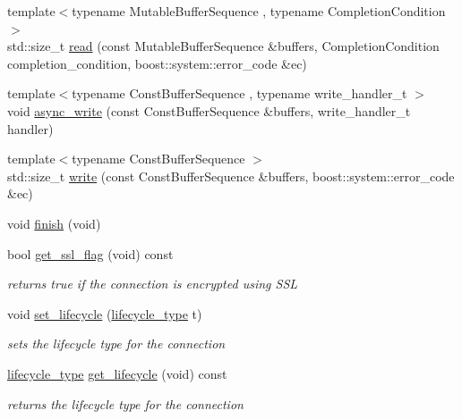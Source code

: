 \begin{DoxyCompactItemize}
\item 
{\footnotesize template$<$typename Mutable\-Buffer\-Sequence , typename Completion\-Condition $>$ }\\std\-::size\-\_\-t \hyperlink{classpion_1_1tcp_1_1connection_a7d1cc479b25984a53e0f218e3e48830f}{read} (const Mutable\-Buffer\-Sequence \&buffers, Completion\-Condition completion\-\_\-condition, boost\-::system\-::error\-\_\-code \&ec)
\item 
{\footnotesize template$<$typename Const\-Buffer\-Sequence , typename write\-\_\-handler\-\_\-t $>$ }\\void \hyperlink{classpion_1_1tcp_1_1connection_add2f2ab41a74476529b0e3ab3ca43ee1}{async\-\_\-write} (const Const\-Buffer\-Sequence \&buffers, write\-\_\-handler\-\_\-t handler)
\item 
{\footnotesize template$<$typename Const\-Buffer\-Sequence $>$ }\\std\-::size\-\_\-t \hyperlink{classpion_1_1tcp_1_1connection_a80f286832ed69151923837713e582709}{write} (const Const\-Buffer\-Sequence \&buffers, boost\-::system\-::error\-\_\-code \&ec)
\item 
void \hyperlink{classpion_1_1tcp_1_1connection_aa7ff7a6d8325c9cbfb026c1a441523fe}{finish} (void)
\item 
bool \hyperlink{classpion_1_1tcp_1_1connection_acf7f446c7113617abcff448fbd4ba441}{get\-\_\-ssl\-\_\-flag} (void) const 
\begin{DoxyCompactList}\small\item\em returns true if the connection is encrypted using S\-S\-L \end{DoxyCompactList}\item 
void \hyperlink{classpion_1_1tcp_1_1connection_a440cc929ced689cfe4fe4bec0620162c}{set\-\_\-lifecycle} (\hyperlink{classpion_1_1tcp_1_1connection_a1888aaf31f431a3f00c70c2568f4cb25}{lifecycle\-\_\-type} t)
\begin{DoxyCompactList}\small\item\em sets the lifecycle type for the connection \end{DoxyCompactList}\item 
\hyperlink{classpion_1_1tcp_1_1connection_a1888aaf31f431a3f00c70c2568f4cb25}{lifecycle\-\_\-type} \hyperlink{classpion_1_1tcp_1_1connection_af9000c0fa1af445375f877347de3529a}{get\-\_\-lifecycle} (void) const 
\begin{DoxyCompactList}\small\item\em returns the lifecycle type for the connection \end{DoxyCompactList}\item 

\end{DoxyCompactItemize}

